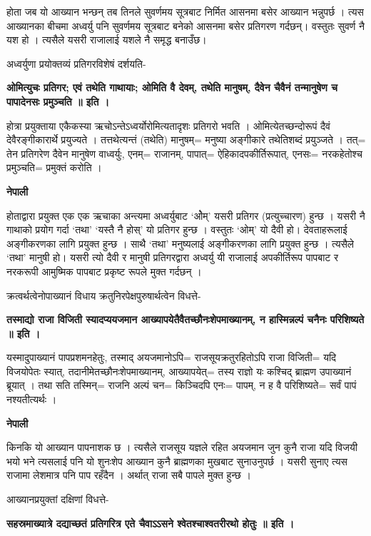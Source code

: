 \documentclass[11pt, a5paper]{article}
\begin{document}
होता जब यो आख्यान भन्छन् तब तिनले सुवर्णमय सूत्रबाट निर्मित आसनमा बसेर आख्यान भन्नुपर्छ । त्यस आख्यानका बीचमा अध्वर्यु पनि सुवर्णमय सूत्रबाट बनेको आसनमा बसेर प्रतिगरण गर्दछन्। वस्तुतः सुवर्ण नै यश हो । त्यसैले यसरी राजालाई यशले नै समृद्ध बनाउँछ।

अध्वर्युणा प्रयोक्तव्यं प्रतिगरविशेषं दर्शयति-

\textbf{ओमित्युचः प्रतिगर; एवं तथेति गाथायाः; ओमिति वै देवम्, तथेति मानुषम्, दैवेन चैवैनं तन्मानुषेण च पापादेनसः प्रमुञ्चति ॥ इति ।}

होत्रा प्रयुक्ताया एकैकस्या ऋचोऽन्तेऽध्वर्योरोमित्यतादृशः प्रतिगरो भवति । ओमित्येतच्छन्दोरूपं दैवं देवैरङ्गीकारार्थे प्रयुज्यते । तत्तथेत्यन्तं (तथेति) मानुषम्= मनुष्या अङ्गीकारे तथेतिशब्दं प्रयुञ्जते । तत्= तेन प्रतिगरेण दैवेन मानुषेण वाध्वर्युः, एनम्= राजानम्, पापात्= ऐहिकादपकीर्तिरूपात्, एनसः= नरकहेतोश्च प्रमुञ्चति= प्रमुक्तं करोति ।

\textbf{नेपाली}

होताद्वारा प्रयुक्त एक एक ऋचाका अन्त्यमा अध्वर्युबाट ‘ओेम्’ यसरी प्रतिगर (प्रत्युच्चारण) हुन्छ । यसरी नै गाथाको प्रयोग गर्दा ‘तथा’ ‘यस्तै नै होस्’ यो प्रतिगर हुन्छ । वस्तुतः ‘ओम्’ यो दैवी हो। देवताहरूलाई अङ्गीकरणका लागि प्रयुक्त हुन्छ । साथै ‘तथा’ मनुष्यलाई अङ्गीकरणका लागि प्रयुक्त हुन्छ । त्यसैले ‘तथा’ मानुषी हो। यसरी त्यो दैवी र मानुषी प्रतिगरद्वारा अध्वर्यु यी राजालाई अपकीर्तिरूप पापबाट र नरकरूपी आमुष्मिक पापबाट प्रकृष्ट रूपले मुक्त गर्दछन् ।

क्रत्वर्थत्वेनोपाख्यानं विधाय क्रतुनिरपेक्षपुरुषार्थत्वेन विधत्ते-

\textbf{तस्माद्यो राजा विजिती स्यादप्ययजमान आख्यापयेतैवैतच्छौनःशेपमाख्यानम्, न हास्मिन्नल्पं चनैनः परिशिष्यते ॥ इति ।}

यस्मादुपाख्यानं पापप्रशमनहेतुः, तस्माद् अयजमानोऽपि= राजसूयक्रतुरहितोऽपि राजा विजिती= यदि विजयोपेतः स्यात्, तदानीमेतच्छौनःशेपमाख्यानम्, आख्यापयेत्= तस्य राज्ञो यः कश्चिद् ब्राह्मण उपाख्यानं ब्रूयात् । तथा सति तस्मिन्= राजनि अल्पं चन= किञ्चिदपि एनः= पापम्, न ह वै परिशिष्यते= सर्वं पापं नश्यतीत्यर्थः ।

\textbf{नेपाली}

किनकि यो आख्यान पापनाशक छ । त्यसैले राजसूय यज्ञले रहित अयजमान जुन कुनै राजा यदि विजयी भयो भने त्यसलाई पनि यो शुनःशेप आख्यान कुनै ब्राह्मणका मुखबाट सुनाउनुपर्छ । यसरी सुनाए त्यस राजामा लेशमात्र पनि पाप रहँदैन । अर्थात् राजा सबै पापले मुक्त हुन्छ ।

आख्यानप्रयुक्तां दक्षिणां विधत्ते-

\textbf{सहस्रमाख्यात्रे दद्याच्छतं प्रतिगरित्र एते चैवाऽऽसने श्वेतश्चाश्वतरीरथो होतुः ॥ इति ।}
\end{document}
